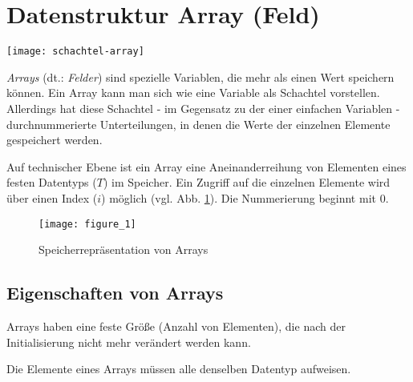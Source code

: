 \documentclass[loesung]{schulein}
\begin{document}
 
\section*{Datenstruktur Array (Feld)}

\begin{floatingfigure}[r]{3.2cm}
\texttt{[image: schachtel-array]}
\end{floatingfigure}
\textit{Arrays} (dt.: \textit{Felder}) sind spezielle Variablen, die mehr als einen Wert speichern können. Ein Array kann man sich wie eine Variable als Schachtel vorstellen. Allerdings hat diese Schachtel - im Gegensatz zu der einer einfachen Variablen - durchnummerierte Unterteilungen, in denen die Werte der einzelnen Elemente gespeichert werden.

Auf technischer Ebene ist ein Array eine Aneinanderreihung von Elementen eines festen Datentyps ($T$) im Speicher. Ein Zugriff auf die einzelnen Elemente wird über einen Index ($i$) möglich (vgl. Abb. \ref{fig_1}). Die Nummerierung beginnt mit 0.




\begin{figure}[h]
\centering
\texttt{[image: figure\_1]}
\caption{Speicherrepräsentation von Arrays}
\label{fig_1}
\end{figure}

\subsection*{Eigenschaften von Arrays}
\begin{smallitemize}
\item Arrays haben eine feste Größe (Anzahl von Elementen), die nach der Initialisierung nicht mehr verändert werden kann.
\item Die Elemente eines Arrays müssen alle denselben Datentyp aufweisen.
\end{smallitemize}
\end{document}

